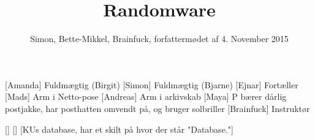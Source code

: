 \documentclass[a4paper,11pt]{article}
\title{Randomware}
\author{Simon, Bette-Mikkel, Brainfuck, forfattermødet af 4. November 2015}
\begin{document}
\maketitle

\begin{roles}
[Amanda] Fuldmægtig (Birgit)
[Simon] Fuldmægtig (Bjarne)
[Ejnar] Fortæller
[Mads] Arm i Netto-pose
[Andreas] Arm i arkivskab
[Maya] P bærer dårlig postjakke, har posthatten omvendt på, og bruger solbriller
[Brainfuck] Instruktør
\end{roles}

\begin{props}
[] 
[]
[KUs database, har et skilt på hvor der står "Database."]
\end{props}
\end{document}
